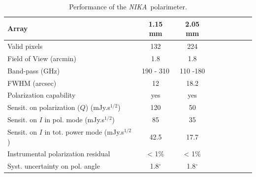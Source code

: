 \documentclass[twocolumn, traditabstract]{aa}
\newcommand{\nika}{{\it NIKA}}
\begin{document}
\begin{table}[t!] 
  \begin{center}\footnotesize
    \caption{Performance of the \nika\ polarimeter.}
    \begin{tabular}{lcccccccc}
      \hline
      \hline
      Array & 1.15 mm & 2.05 mm \\
      \hline
      \hline
      Valid pixels &132 & 224 \\
      Field of View (arcmin) & 1.8 & 1.8 \\
      Band-pass (GHz) & 190 - 310 & 110 -180\\
      FWHM (arcsec) & 12 & 18.2 \\
      Polarization capability & yes & yes \\
      Sensit. on polarization ($Q$)    (mJy.s$^{1/2}$) & 120 & 50 \\
      Sensit. on $I$ in pol. mode (mJy.s$^{1/2}$) & 85 & 35 \\
      Sensit. on $I$ in tot. power mode (mJy.s$^{1/2}$) & 42.5 & 17.7 \\
      Instrumental polarization residual & < 1\% &  < 1\% \\
      Syst. uncertainty on pol. angle & 1.8$^{\circ}$ & 1.8$^{\circ}$ \\
 \hline
      \hline
    \end{tabular}
    \label{tab:nika_performance}
  \end{center}
\end{table}
\end{document}
